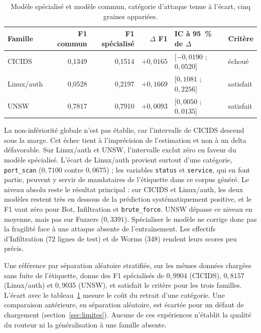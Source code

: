 \begin{table}[H]
\centering
\small
\caption{Modèle spécialisé et modèle commun, catégorie d'attaque tenue à l'écart, cinq graines appariées.}
\label{tab:e-h3b-family-models}
\begin{tabularx}{\textwidth}{XrrrXl}
\toprule
\textbf{Famille} & \textbf{F1 commun} & \textbf{F1 spécialisé} & \textbf{$\Delta$ F1} & \textbf{IC à 95~\% de $\Delta$} & \textbf{Critère} \\
\midrule
CICIDS & 0,1349 & 0,1514 & $+0{,}0165$ & [$-0{,}0190$ ; $0{,}0520$] & échoué \\
Linux/auth & 0,0528 & 0,2197 & $+0{,}1669$ & [$0{,}1081$ ; $0{,}2256$] & satisfait \\
UNSW & 0,7817 & 0,7910 & $+0{,}0093$ & [$0{,}0050$ ; $0{,}0135$] & satisfait \\
\bottomrule
\end{tabularx}
\end{table}

La non-infériorité globale n'est pas établie, car l'intervalle de CICIDS descend sous la marge. Cet échec tient à l'imprécision de l'estimation et non à un delta défavorable. Sur Linux/auth et UNSW, l'intervalle exclut zéro en faveur du modèle spécialisé. L'écart de Linux/auth provient surtout d'une catégorie, \texttt{port\_scan} ($0{,}7100$ contre $0{,}0675$) ; les variables \texttt{status} et \texttt{service}, qui en font partie, peuvent y servir de mandataires de l'étiquette dans ce corpus généré. Le niveau absolu reste le résultat principal : sur CICIDS et Linux/auth, les deux modèles restent très en dessous de la prédiction systématiquement positive, et le F1 vaut zéro pour Bot, Infiltration et \texttt{brute\_force}. UNSW dépasse ce niveau en moyenne, mais pas sur Fuzzers ($0{,}3391$). Spécialiser le modèle ne corrige donc pas la fragilité face à une attaque absente de l'entraînement. Les effectifs d'Infiltration (72 lignes de test) et de Worms (348) rendent leurs scores peu précis.

Une référence par séparation aléatoire stratifiée, sur les mêmes données chargées sans fuite de l'étiquette, donne des F1 spécialisés de $0{,}9904$ (CICIDS), $0{,}8157$ (Linux/auth) et $0{,}9035$ (UNSW), et satisfait le critère pour les trois familles. L'écart avec le tableau~\ref{tab:e-h3b-family-models} mesure le coût du retrait d'une catégorie. Une comparaison antérieure, en séparation aléatoire, est écartée pour un défaut de chargement (section~\ref{sec:limites}). Aucune de ces expériences n'établit la qualité du routeur ni la généralisation à une famille absente.

